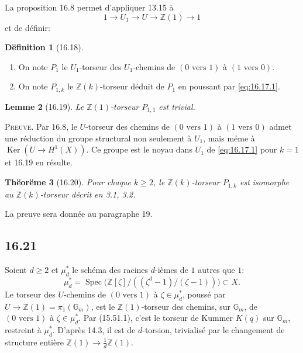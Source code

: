 \documentclass[12pt,a4paper]{article}
\theoremstyle{plain}
\newtheorem{theorem}{Th\"eor\"eme}[section]
\newtheorem{lemma}[theorem]{Lemme}
\theoremstyle{definition}
\newtheorem{definition}[theorem]{D\"efinition}
\theoremstyle{remark}
\DeclareMathOperator{\Ker}{Ker}
\DeclareMathOperator{\Spec}{Spec}
\newcommand{\Gm}{\mathbb{G}_m}
\newcommand{\ZZ}{\mathbb{Z}}
\begin{document}
La proposition 16.8 permet d'appliquer 13.15 \`a
\[
1 \to U_1 \to U \to \ZZ(1) \to 1
\]
et de d\'efinir:

\begin{definition}[16.18]\label{def:16.18}
\begin{enumerate}
\item[(i)] On note $P_1$ le $U_1$-torseur des $U_1$-chemins de
$(0 \text{ vers } 1)$ \`a $(1 \text{ vers } 0)$.
\item[(ii)] On note $P_{1,k}$ le $\ZZ(k)$-torseur d\'eduit de $P_1$ en
poussant par \eqref{eq:16.17.1}.
\end{enumerate}
\end{definition}

\begin{lemma}[16.19]\label{lem:16.19}
Le $\ZZ(1)$-torseur $P_{1,1}$ est trivial.
\end{lemma}

\noindent \textsc{Preuve.} Par 16.8, le $U$-torseur des chemins de
$(0 \text{ vers } 1)$ \`a $(1 \text{ vers } 0)$ admet une r\'eduction du groupe
structural non seulement \`a $U_1$, mais m\'eme \`a
$\Ker(U \to H^1(X))$. Ce groupe est le noyau dans $U_1$ de
\eqref{eq:16.17.1} pour $k=1$ et 16.19 en r\'esulte.

\begin{theorem}[16.20]\label{thm:16.20}
Pour chaque $k \geq 2$, le $\ZZ(k)$-torseur $P_{1,k}$ est isomorphe au
$\ZZ(k)$-torseur d\'ecrit en 3.1, 3.2.
\end{theorem}

La preuve sera donn\'ee au paragraphe 19.

\subsection*{16.21}

Soient $d \geq 2$ et $\mu_d^*$ le sch\'ema des racines $d$-i\`emes de $1$
autres que $1$:
\[
\mu_d^* = \Spec\bigl(\ZZ[\zeta]/((\zeta^d-1)/(\zeta-1))\bigr) \subset X.
\]
Le torseur des $U$-chemins de $(0 \text{ vers } 1)$ \`a
$\zeta \in \mu_d^*$, pouss\'e par $U \to \ZZ(1) = \pi_1(\Gm)$, est le
$\ZZ(1)$-torseur des chemins, sur $\Gm$, de $(0 \text{ vers } 1)$ \`a
$\zeta \in \mu_d^*$. Par (15.51.1), c'est le torseur de Kummer $K(q)$ sur
$\Gm$, restreint \`a $\mu_d^*$. D'apr\`es 14.3, il est de $d$-torsion,
trivialis\'e par le changement de structure enti\`ere
$\ZZ(1) \to \frac{1}{d}\ZZ(1)$.
\end{document}
